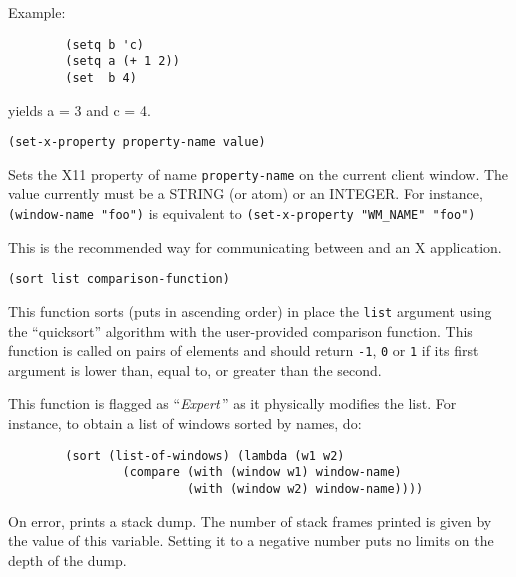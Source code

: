 Example:{\exemplefont\upspace\begin{verbatim}
        (setq b 'c)
        (setq a (+ 1 2))
        (set  b 4)
\end{verbatim}}
yields a = 3 and c = 4.

        
{\usagefont\begin{verbatim}
(set-x-property property-name value)
\end{verbatim}}\usageupspace

Sets the X11 property of name \verb"property-name" on  the current client
window.  The value currently must be a STRING (or atom) or an INTEGER\@.  For
instance, \verb|(window-name "foo")| is equivalent to 
\verb|(set-x-property "WM_NAME" "foo")|

This is the recommended way for communicating between {\GWM} and an X 
application.


{\usagefont\begin{verbatim}
(sort list comparison-function)
\end{verbatim}}\usageupspace

This function sorts (puts in ascending order)
in place the \verb"list" argument using the ``quicksort''
algorithm with the user-provided comparison function.
This function is called on pairs of elements and should return
\verb"-1", \verb"0" or \verb"1" if its first argument is lower than, equal
to, or greater than the second.

This function is flagged as ``{\em Expert}\,'' as it physically modifies the
list. For instance, to obtain a list of windows sorted by names, do:

{\exemplefont\begin{verbatim}
        (sort (list-of-windows) (lambda (w1 w2)
                (compare (with (window w1) window-name)
                         (with (window w2) window-name))))
\end{verbatim}}



On error, {\WOOL} prints a stack dump. The number of stack frames printed
is given by the value of this variable. Setting it to a negative number 
puts no limits on the depth of the dump.


